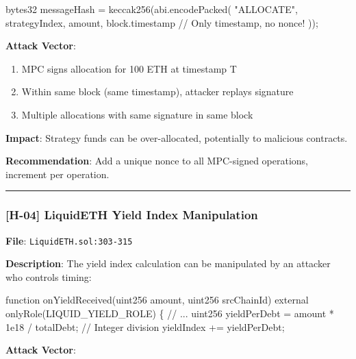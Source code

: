 \documentclass[
]{article}
\newenvironment{Shaded}{}{}
\newcommand{\NormalTok}[1]{#1}
\providecommand{\tightlist}{%
  \setlength{\itemsep}{0pt}\setlength{\parskip}{0pt}}
\begin{document}
\begin{Shaded}
\begin{Highlighting}[]
\NormalTok{bytes32 messageHash = keccak256(abi.encodePacked(}
\NormalTok{    "ALLOCATE",}
\NormalTok{    strategyIndex,}
\NormalTok{    amount,}
\NormalTok{    block.timestamp  // Only timestamp, no nonce!}
\NormalTok{));}
\end{Highlighting}
\end{Shaded}

\textbf{Attack Vector}:

\begin{enumerate}
\def\labelenumi{\arabic{enumi}.}
\tightlist
\item
  MPC signs allocation for 100 ETH at timestamp T
\item
  Within same block (same timestamp), attacker replays signature
\item
  Multiple allocations with same signature in same block
\end{enumerate}

\textbf{Impact}: Strategy funds can be over-allocated, potentially to
malicious contracts.

\textbf{Recommendation}: Add a unique nonce to all MPC-signed
operations, increment per operation.

\begin{center}\rule{0.5\linewidth}{0.5pt}\end{center}

\subsubsection{{[}H-04{]} LiquidETH Yield Index
Manipulation}\label{h-04-liquideth-yield-index-manipulation}

\textbf{File}: \texttt{LiquidETH.sol:303-315}

\textbf{Description}: The yield index calculation can be manipulated by
an attacker who controls timing:

\begin{Shaded}
\begin{Highlighting}[]
\NormalTok{function onYieldReceived(uint256 amount, uint256 srcChainId) external onlyRole(LIQUID\_YIELD\_ROLE) \{}
\NormalTok{    // ...}
\NormalTok{    uint256 yieldPerDebt = amount * 1e18 / totalDebt;  // Integer division}
\NormalTok{    yieldIndex += yieldPerDebt;}
\end{Highlighting}
\end{Shaded}

\textbf{Attack Vector}:
\end{document}
